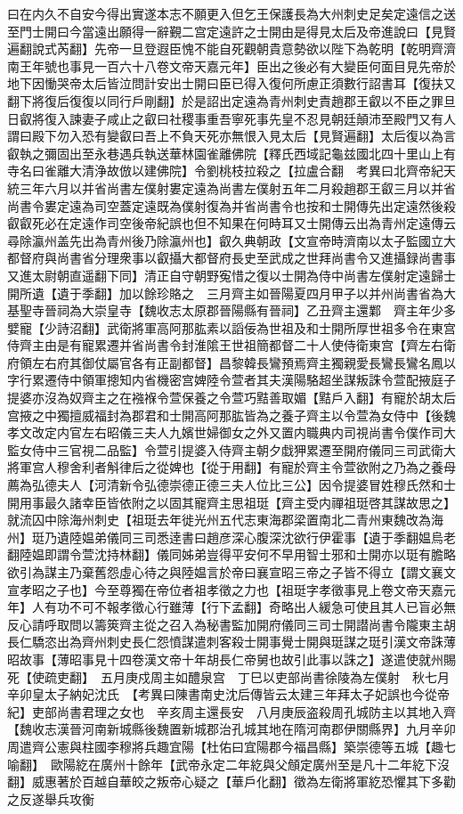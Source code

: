 曰在内久不自安今得出實遂本志不願更入但乞王保護長為大州刺史足矣定遠信之送至門士開曰今當遠出願得一辭覲二宫定遠許之士開由是得見太后及帝進說曰【見賢遍翻說式芮翻】先帝一旦登遐臣愧不能自死觀朝貴意勢欲以陛下為乾明【乾明齊濟南王年號也事見一百六十八卷文帝天嘉元年】臣出之後必有大變臣何面目見先帝於地下因慟哭帝太后皆泣問計安出士開曰臣已得入復何所慮正須數行詔書耳【復扶又翻下將復后復復以同行戶剛翻】於是詔出定遠為青州刺史責趙郡王叡以不臣之罪旦日叡將復入諫妻子咸止之叡曰社稷事重吾寧死事先皇不忍見朝廷顛沛至殿門又有人謂曰殿下勿入恐有變叡曰吾上不負天死亦無恨入見太后【見賢遍翻】太后復以為言叡執之彌固出至永巷遇兵執送華林園雀離佛院【釋氏西域記龜兹國北四十里山上有寺名曰雀離大清浄故倣以建佛院】令劉桃枝拉殺之【拉盧合翻　考異曰北齊帝紀天統三年六月以并省尚書左僕射婁定遠為尚書左僕射五年二月殺趙郡王叡三月以并省尚書令婁定遠為司空蓋定遠既為僕射復為并省尚書令也按和士開傳先出定遠然後殺叡叡死必在定遠作司空後帝紀誤也但不知果在何時耳又士開傳云出為青州定遠傳云尋除瀛州盖先出為青州後乃除瀛州也】叡久典朝政【文宣帝時濟南以太子監國立大都督府與尚書省分理衆事以叡攝大都督府長史至武成之世拜尚書令又進攝録尚書事又進太尉朝直遥翻下同】清正自守朝野寃惜之復以士開為侍中尚書左僕射定遠歸士開所遺【遺于季翻】加以餘珍賂之　三月齊主如晉陽夏四月甲子以并州尚書省為大基聖寺晉祠為大崇皇寺【魏收志太原郡晉陽縣有晉祠】乙丑齊主還鄴　齊主年少多嬖寵【少詩沼翻】武衛將軍高阿那肱素以謟佞為世祖及和士開所厚世祖多令在東宫侍齊主由是有寵累遷并省尚書令封淮隂王世祖簡都督二十人使侍衛東宫【齊左右衛府領左右府其御仗屬官各有正副都督】昌黎韓長鸞預焉齊主獨親愛長鸞長鸞名鳳以字行累遷侍中領軍摠知内省機密宫婢陸令萱者其夫漢陽駱超坐謀叛誅令萱配掖庭子提婆亦沒為奴齊主之在襁褓令萱保養之令萱巧黠善取媚【黠戶入翻】有寵於胡太后宫掖之中獨擅威福封為郡君和士開高阿那肱皆為之養子齊主以令萱為女侍中【後魏孝文改定内官左右昭儀三夫人九嬪世婦御女之外又置内職典内司視尚書令僕作司大監女侍中三官視二品監】令萱引提婆入侍齊主朝夕戱狎累遷至開府儀同三司武衛大將軍宫人穆舍利者斛律后之從婢也【從于用翻】有寵於齊主令萱欲附之乃為之養母薦為弘德夫人【河清新令弘德崇德正德三夫人位比三公】因令提婆冒姓穆氏然和士開用事最久諸幸臣皆依附之以固其寵齊主思祖珽【齊主受内禪祖珽啓其謀故思之】就流囚中除海州刺史【祖珽去年徙光州五代志東海郡梁置南北二青州東魏改為海州】珽乃遺陸媪弟儀同三司悉逹書曰趙彦深心腹深沈欲行伊霍事【遺于季翻媪烏老翻陸媪即謂令萱沈持林翻】儀同姊弟豈得平安何不早用智士邪和士開亦以珽有膽略欲引為謀主乃棄舊怨虛心待之與陸媪言於帝曰襄宣昭三帝之子皆不得立【謂文襄文宣孝昭之子也】今至尊獨在帝位者祖孝徵之力也【祖珽字孝徵事見上卷文帝天嘉元年】人有功不可不報孝徵心行雖薄【行下孟翻】奇略出人緩急可使且其人已盲必無反心請呼取問以籌筴齊主從之召入為秘書監加開府儀同三司士開譛尚書令隴東主胡長仁驕恣出為齊州刺史長仁怨憤謀遣刺客殺士開事覺士開與珽謀之珽引漢文帝誅薄昭故事【薄昭事見十四卷漢文帝十年胡長仁帝舅也故引此事以誅之】遂遣使就州賜死【使疏吏翻】　五月庚戍周主如醴泉宫　丁巳以吏部尚書徐陵為左僕射　秋七月辛卯皇太子納妃沈氏　【考異曰陳書南史沈后傳皆云太建三年拜太子妃誤也今從帝紀】吏部尚書君理之女也　辛亥周主還長安　八月庚辰盗殺周孔城防主以其地入齊【魏收志漢晉河南新城縣後魏置新城郡治孔城其地在隋河南郡伊關縣界】九月辛卯周遣齊公憲與柱國李穆將兵趣宜陽【杜佑曰宜陽郡今福昌縣】築崇德等五城【趣七喻翻】　歐陽紇在廣州十餘年【武帝永定二年紇與父頠定廣州至是凡十二年紇下沒翻】威惠著於百越自華皎之叛帝心疑之【華戶化翻】徵為左衛將軍紇恐懼其下多勸之反遂舉兵攻衡